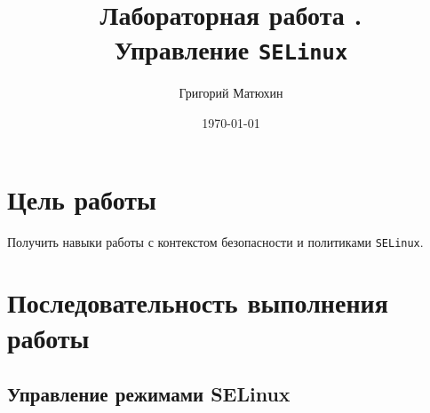 \documentclass[12pt]{article}
\author{Григорий Матюхин}
\date{\today}
\title{Лабораторная работа \textnumero9.\\Управление \texttt{SELinux}}
\begin{document}
\maketitle
\newpage
\tableofcontents
\newpage
\section{Цель работы}
Получить навыки работы с контекстом безопасности и политиками \texttt{SELinux}.

\section{Последовательность выполнения работы}
\subsection{Управление режимами SELinux}
\end{document}
